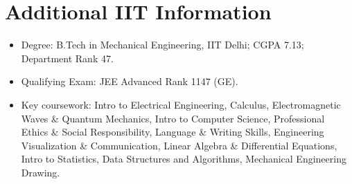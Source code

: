 \documentclass[11pt,a4paper]{article}
\begin{document}
\section*{Additional IIT Information}
\begin{itemize}
  \item Degree: B.Tech in Mechanical Engineering, IIT Delhi; CGPA 7.13; Department Rank 47.
  \item Qualifying Exam: JEE Advanced Rank 1147 (GE).
  \item Key coursework: Intro to Electrical Engineering, Calculus, Electromagnetic Waves \& Quantum Mechanics, Intro to Computer Science, Professional Ethics \& Social Responsibility, Language \& Writing Skills, Engineering Visualization \& Communication, Linear Algebra \& Differential Equations, Intro to Statistics, Data Structures and Algorithms, Mechanical Engineering Drawing.
\end{itemize}
\end{document}
